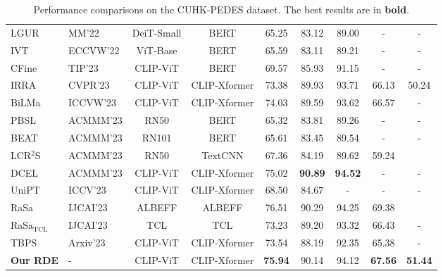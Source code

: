 \documentclass[10pt,twocolumn,letterpaper]{article}
\begin{document}
\begin{table}[t]
{\begin{tabular}{l|lcc|ccccc}
LGUR~\cite{shao2022learning}               & MM'22     & DeiT-Small & BERT         & 65.25  & 83.12  & 89.00   & -     & -     \\
IVT~\cite{shu2022see}                & ECCVW'22  & ViT-Base   & BERT         & 65.59  & 83.11  & 89.21   & -     & -     \\
CFine~\cite{yan2022clip}              & TIP'23  & CLIP-ViT   & BERT         & 69.57  & 85.93  & 91.15   & -     & -     \\
IRRA~\cite{jiang2023cross}               & CVPR'23   & CLIP-ViT   & CLIP-Xformer & 73.38  & 89.93  & 93.71   & 66.13 & 50.24 \\
BiLMa~\cite{fujii2023bilma}    & ICCVW'23   & CLIP-ViT   & CLIP-Xformer  &74.03& 89.59& 93.62 &66.57&-\\ 

PBSL~\cite{shen2023pedestrian}&ACMMM'23 & RN50&BERT&65.32 &83.81 &89.26&-&-\\
BEAT\cite{ma2023beat}&ACMMM'23&RN101&BERT& 65.61& 83.45&89.54&-&-\\ 
LCR$^2$S~\cite{yan2023learning}&ACMMM'23&RN50&TextCNN&67.36& 84.19& 89.62& 59.24&\\
DCEL~\cite{li2023dcel}&ACMMM'23&CLIP-ViT& CLIP-Xformer &   75.02&  \textbf{90.89}&  \textbf{94.52}& -& -\\
UniPT~\cite{shao2023unified}&ICCV'23&CLIP-ViT& CLIP-Xformer &68.50& 84.67 &-&-&-\\ 
\color{gray!60} 
 RaSa~\cite{bai2023rasa}&\color{gray!60} IJCAI'23&\color{gray!60} ALBEFF&\color{gray!60} ALBEFF&\color{gray!60} 76.51& \color{gray!60} 90.29 &\color{gray!60} 94.25 &\color{gray!60} 69.38&\\
RaSa$_{\text{TCL}}$~\cite{bai2023rasa}&IJCAI'23&TCL&TCL&73.23& 89.20& 93.32& 66.43&-\\
TBPS~\cite{cao2023empirical}&Arxiv'23&CLIP-ViT& CLIP-Xformer&73.54& 88.19 &92.35& 65.38&-\\
\midrule
\textbf{Our RDE}& -& CLIP-ViT& CLIP-Xformer & \textbf{75.94} &{90.14}& {94.12} &\textbf{67.56}& \textbf{51.44} \\  

\bottomrule[1pt]
\end{tabular}}
\caption{Performance comparisons on the CUHK-PEDES dataset. The best results are in \textbf{bold}.} 
\label{tabcuhk}
\end{table}
\end{document}
